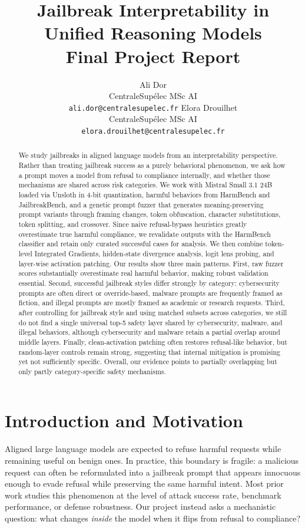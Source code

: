 \documentclass{article}
\title{Jailbreak Interpretability in Unified Reasoning Models\\\large Final Project Report}
\author{
Ali Dor \\
CentraleSup\'elec MSc AI \\
\texttt{ali.dor@centralesupelec.fr}
\And
Elora Drouilhet \\
CentraleSup\'elec MSc AI \\
\texttt{elora.drouilhet@centralesupelec.fr}
}
\begin{document}
\maketitle

\begin{abstract}
We study jailbreaks in aligned language models from an interpretability perspective. Rather than treating jailbreak success as a purely behavioral phenomenon, we ask how a prompt moves a model from refusal to compliance internally, and whether those mechanisms are shared across risk categories. We work with Mistral Small 3.1 24B loaded via Unsloth in 4-bit quantization, harmful behaviors from HarmBench and JailbreakBench, and a genetic prompt fuzzer that generates meaning-preserving prompt variants through framing changes, token obfuscation, character substitutions, token splitting, and crossover. Since naive refusal-bypass heuristics greatly overestimate true harmful compliance, we revalidate outputs with the HarmBench classifier and retain only curated successful cases for analysis. We then combine token-level Integrated Gradients, hidden-state divergence analysis, logit lens probing, and layer-wise activation patching. Our results show three main patterns. First, raw fuzzer scores substantially overestimate real harmful behavior, making robust validation essential. Second, successful jailbreak styles differ strongly by category: cybersecurity prompts are often direct or override-based, malware prompts are frequently framed as fiction, and illegal prompts are mostly framed as academic or research requests. Third, after controlling for jailbreak style and using matched subsets across categories, we still do not find a single universal top-5 safety layer shared by cybersecurity, malware, and illegal behaviors, although cybersecurity and malware retain a partial overlap around middle layers. Finally, clean-activation patching often restores refusal-like behavior, but random-layer controls remain strong, suggesting that internal mitigation is promising yet not sufficiently specific. Overall, our evidence points to partially overlapping but only partly category-specific safety mechanisms.
\end{abstract}

\section{Introduction and Motivation}
Aligned large language models are expected to refuse harmful requests while remaining useful on benign ones. In practice, this boundary is fragile: a malicious request can often be reformulated into a jailbreak prompt that appears innocuous enough to evade refusal while preserving the same harmful intent. Most prior work studies this phenomenon at the level of attack success rate, benchmark performance, or defense robustness. Our project instead asks a mechanistic question: what changes \emph{inside} the model when it flips from refusal to compliance?
\end{document}
